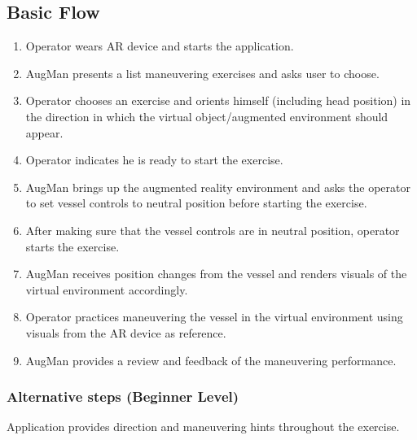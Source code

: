 
\subsection{Basic Flow}
\begin{enumerate}[itemsep=.01em]
	\item Operator wears AR device and starts the application. 
	\item AugMan presents a list maneuvering exercises and asks user to choose.
	\item Operator chooses an exercise and orients himself (including head position) in the direction in which the virtual object/augmented environment should appear.
	\item Operator indicates he is ready to start the exercise.
	\item AugMan brings up the augmented reality environment and asks the operator to set vessel controls to neutral position before starting the exercise.
	\item After making sure that the vessel controls are in neutral position, operator starts the exercise. 
	\item AugMan receives position changes from the vessel and renders visuals of the virtual environment accordingly.
	\item Operator practices maneuvering the vessel in the virtual environment using visuals from the AR device as reference.
	\item AugMan provides a review and feedback of the maneuvering performance.
\end{enumerate}

\subsubsection{Alternative steps (Beginner Level)}

Application provides direction and maneuvering hints throughout the exercise.

